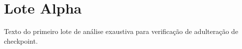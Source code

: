 \documentclass{article}
\begin{document}
\section{Lote Alpha}
Texto do primeiro lote de análise exaustiva para verificação de adulteração de checkpoint.

\end{document}
